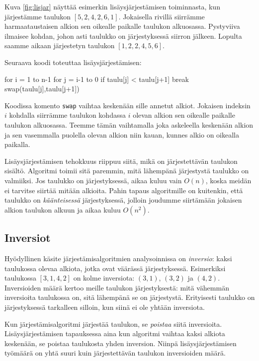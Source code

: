 Kuva \ref{fig:lisjar} näyttää esimerkin lisäysjärjestämisen
toiminnasta, kun järjes\-tämme taulukon $[5,2,4,2,6,1]$.
Jokaisella rivillä siirrämme harmaataustaisen alkion
sen oikealle paikalle taulukon alkuosassa.
Pystyviiva ilmaisee kohdan, johon asti taulukko on järjestyksessä
siirron jälkeen.
Lopulta saamme aikaan järjestetyn taulukon $[1,2,2,4,5,6]$.

Seuraava koodi toteuttaa lisäysjärjestämisen:

\begin{code}
for i = 1 to n-1
    for j = i-1 to 0
        if taulu[j] < taulu[j+1]
            break
        swap(taulu[j],taulu[j+1])
\end{code}

Koodissa komento \texttt{swap} vaihtaa keskenään
sille annetut alkiot.
Jokaisen indeksin $i$ kohdalla siirrämme taulukon
kohdassa $i$ olevan alkion sen oikealle paikalle
taulukon alkuosassa.
Teemme tämän vaihtamalla joka askeleella keskenään
alkion ja sen vasemmalla puolella olevan alkion
niin kauan, kunnes alkio on oikealla paikalla.

Lisäysjärjestämisen tehokkuus riippuu siitä,
mikä on järjestettävän taulukon sisältö.
Algoritmi toimii sitä paremmin, mitä lähempänä järjestystä
taulukko on valmiiksi.
Jos taulukko on järjestyksessä,
aikaa kuluu vain $O(n)$, koska meidän ei tarvitse siirtää
mitään alkioita.
Pahin tapaus algoritmille on kuitenkin, että taulukko on
\emph{käänteisessä} järjestyksessä,
jolloin joudumme siirtämään jokaisen alkion
taulukon alkuun ja aikaa kuluu $O(n^2)$.

\subsection{Inversiot}

Hyödyllinen käsite järjestämisalgoritmien analysoinnissa
on \emph{inversio}: kaksi taulukossa olevaa alkiota,
jotka ovat väärässä järjestyksessä.
Esimerkiksi taulukossa $[3,1,4,2]$ on kolme inversiota:
$(3,1)$, $(3,2)$ ja $(4,2)$.
Inversioiden määrä kertoo meille taulukon järjestyksestä:
mitä vähemmän inversioita taulukossa on,
sitä lähempänä se on järjestystä.
Erityisesti taulukko on järjestyksessä tarkalleen silloin,
kun siinä ei ole yhtään inversiota.

Kun järjestämisalgoritmi järjestää taulukon,
se \emph{poistaa} siitä inversioita.
Lisäysjärjestämisen tapauksessa aina kun
algoritmi vaihtaa kaksi alkiota keskenään,
se poistaa taulukosta yhden inversion.
Niinpä lisäysjärjestämisen työmäärä on yhtä suuri
kuin järjestettävän taulukon inversioiden määrä.

